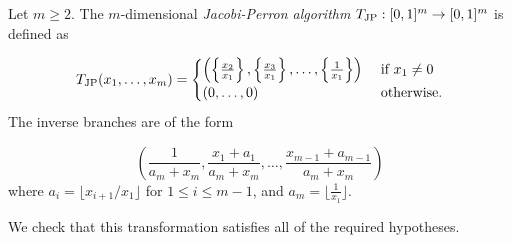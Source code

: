 \documentclass[12pt,a4paper,reqno]{amsart}
\begin{document}
Let $ m \geq 2$.  The $m$-dimensional \emph{Jacobi-Perron algorithm}  $T_{\rm JP}:[0,1]^m \to [0,1]^m$  is
defined as

$$
T_{\rm JP}(x_1, \ldots, x_m)
=\begin{cases}  \left( \left\{ \frac{x_2}{x_1} \right\},
 \left\{ \frac{x_3}{x_1}\right\}, \ldots , 
 \left\{ \frac{1}{x_1}\right\}\right)  & \hbox{ if } x_1 \neq 0\\
 (0,\ldots, 0)&  \hbox{ otherwise}.
 \end{cases}
$$
The inverse branches are of the form 

$$
 \left( \frac {1} {a_m+ x_m}, \frac {x_1+a_{1}} {a_m+ x_m},
 \ldots,   \frac {x_{m-1}+a_{m-1}} {a_m + x_m}\right)$$
 where $a_i =  \lfloor x_{i+1}/x_1 \rfloor $ for $1 \leq i \leq m-1$,  and $a_m=  \lfloor  \frac{1}{x_1} \rfloor $.
 
 
We check that this transformation  satisfies  all of the required hypotheses.
\end{document}

